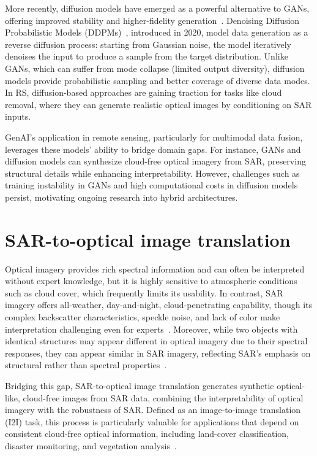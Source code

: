 More recently, diffusion models have emerged as a powerful alternative to GANs, offering improved stability and higher-fidelity generation~\cite{c_diffusion_s2o}. Denoising Diffusion Probabilistic Models (DDPMs)~\cite{DDPM_2020}, introduced in 2020, model data generation as a reverse diffusion process: starting from Gaussian noise, the model iteratively denoises the input to produce a sample from the target distribution. Unlike GANs, which can suffer from mode collapse (limited output diversity), diffusion models provide probabilistic sampling and better coverage of diverse data modes. In RS, diffusion-based approaches are gaining traction for tasks like cloud removal, where they can generate realistic optical images by conditioning on SAR inputs.

GenAI's application in remote sensing, particularly for multimodal data fusion, leverages these models' ability to bridge domain gaps. For instance, GANs and diffusion models can synthesize cloud-free optical imagery from SAR, preserving structural details while enhancing interpretability. However, challenges such as training instability in GANs and high computational costs in diffusion models persist, motivating ongoing research into hybrid architectures.

\section{SAR-to-optical image translation}
Optical imagery provides rich spectral information and can often be interpreted without expert knowledge, but it is highly sensitive to atmospheric conditions such as cloud cover, which frequently limits its usability. In contrast, SAR imagery offers all-weather, day-and-night, cloud-penetrating capability, though its complex backscatter characteristics, speckle noise, and lack of color make interpretation challenging even for experts~\cite{s2o_color_super_diff}. Moreover, while two objects with identical structures may appear different in optical imagery due to their spectral responses, they can appear similar in SAR imagery, reflecting SAR’s emphasis on structural rather than spectral properties~\cite{RS_Data_Fusion_GANs_sota}. 

Bridging this gap, SAR-to-optical image translation generates synthetic optical-like, cloud-free images from SAR data, combining the interpretability of optical imagery with the robustness of SAR. Defined as an image-to-image translation (I2I) task, this process is particularly valuable for applications that depend on consistent cloud-free optical information, including land-cover classification, disaster monitoring, and vegetation analysis~\cite{CR_SEN2_dRNN}.

